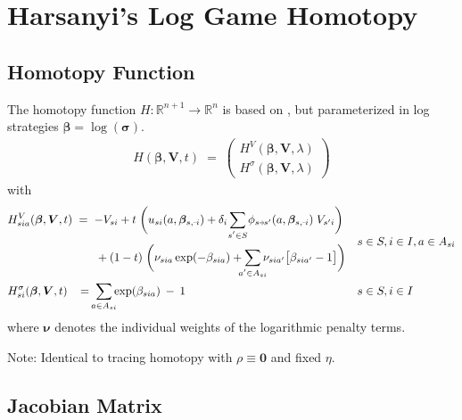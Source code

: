 \documentclass[11pt,fleqn]{article}
\newcommand{\R}{\mathbb{R}}
\newcommand{\bsigma}{\bm{\sigma}}
\newcommand{\bbeta}{\bm{\beta}}
\newcommand{\bV}{\bm{V}}
\newcommand{\bnu}{\bm{\nu}}
\newcommand{\bzero}{\bm{0}}
\newcommand{\shortminus}{{\text{\scalebox{0.4}[1.0]{\(-\)}}}}
\newcommand{\minusi}{\shortminus i}
\newcommand{\shortrightarrow}{\parbox{4pt}{\tikz{\draw[->](0,0)--(4pt,0);}}}
\newcommand{\phiss}{\phi_{s\shortrightarrow s'}}
\begin{document}
\newpage
\section{Harsanyi's Log Game Homotopy}


\subsection*{Homotopy Function}

The homotopy function $H: \R^{n+1} \rightarrow \R^n$ is based on \citet[eqn.~X, p.~Y]{Eibelshaeuseretal2021LogGame}, but parameterized in log strategies $\bbeta = \log(\bsigma)$.
\begin{align*}
	H(\bbeta,\bV,t) \;=\;
	\begin{pmatrix} 
		H^{V}(\bbeta,\bV,\lambda) \\ 
		H^{\sigma}(\bbeta,\bV,\lambda) 
	\end{pmatrix}
\end{align*}
with
\begin{align*}
	& \begin{aligned}
		H^V_{sia}(\bbeta,\bV,t) & \;=\; - V_{si} + t \; \biggl( u_{si}(a,\bbeta_{s,\minusi}) + \delta_i \sum\limits_{\mathclap{s'\in S}} \phiss(a,\bbeta_{s,\minusi}) \; V_{s'i} \biggr) \\
		& \qquad + (1-t) \; \biggl( \nu_{sia} \exp(-\beta_{sia}) + \sum\limits_{\mathclap{a'\in A_{si}}} \nu_{sia'} \bigl[ \beta_{sia'} - 1 \bigr] \biggr)
	\end{aligned} && s\in S, i\in I, a\in A_{si} \\
	& H^\sigma_{si}(\bbeta,\bV,t) \;\; \;=\; \sum\limits_{\mathclap{a\in A_{si}}} \exp(\beta_{sia}) \:-\: 1 && s\in S, i\in I
\end{align*}
where $\bnu$ denotes the individual weights of the logarithmic penalty terms.

Note: Identical to tracing homotopy with $\rho \equiv \bzero$ and fixed $\eta$.


\subsection*{Jacobian Matrix}
\end{document}
